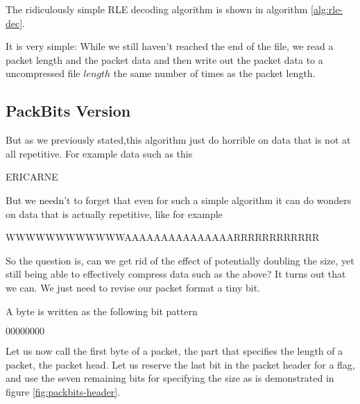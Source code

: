 \begin{refsection}
\begin{algorithm}
\begin{algorithmic}[1]

    \While{\neof}
        \State {}
      \EndRepeatn


    \EndWhile
  \end{algorithmic}
\end{algorithm}

The ridiculously simple RLE decoding algorithm is shown in algorithm
\ref{alg:rle-dec}.

It is very simple: While we still haven't reached the end of the file,
we read a packet length and the packet data and then write out the
packet data to a uncompressed file $length$ the same number of times
as the packet length.



\subsection{PackBits Version}
\label{sec:packbits-version}



But as we previously stated,this algorithm just do horrible on data that
is not at all repetitive. For example data such as this

\begin{indentpar}
  ERICARNE
\end{indentpar}

But we needn't to forget that even for such a simple algorithm it can do
wonders on data that is actually repetitive, like for example

\begin{indentpar}
  WWWWWWWWWWWWAAAAAAAAAAAAAAARRRRRRRRRRRR
\end{indentpar}

So the question is, can we get rid of the effect of potentially
doubling the size, yet still being able to effectively compress data
such as the above?  It turns out that we can. We just need to revise
our packet format a tiny bit.

A byte is written as the following bit pattern

\begin{indentpar}
  $00000000$
\end{indentpar}

Let us now call the first byte of a packet, the part that specifies
the length of a packet, the packet head. Let us
reserve the last bit in the packet header for a flag, and use the
seven remaining bits for specifying the size as is demonstrated in
figure \ref{fig:packbits-header}.


\end{refsection}
